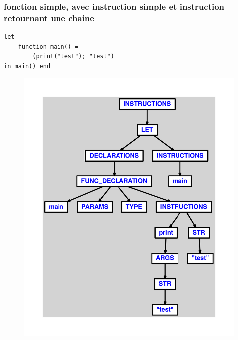 \documentclass{article}
\begin{document}
\subsubsection{fonction simple, avec instruction simple et instruction retournant une chaine}
\begin{lstlisting}
let
	function main() =
		(print("test"); "test")
in main() end
\end{lstlisting}
\newpage
\begin{figure}[H]
\centering
\includegraphics[max width=\textwidth]{ast/ast_239.pdf}
\end{figure}
\newpage
\end{document}
